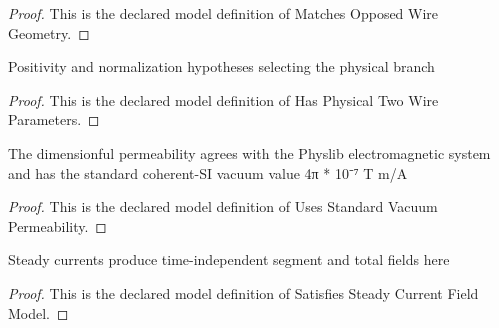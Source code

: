 \begin{proof}
  This is the declared model definition of Matches Opposed Wire Geometry.
\end{proof}
\begin{definition}
  \label{def:physics:phyx-mini-0960:phyxminiproblems-problemphyxmini0960-hasphysicaltwowireparameters}
  Positivity and normalization hypotheses selecting the physical branch
\end{definition}
\begin{proof}
  This is the declared model definition of Has Physical Two Wire Parameters.
\end{proof}
\begin{definition}
  \label{def:physics:phyx-mini-0960:phyxminiproblems-problemphyxmini0960-usesstandardvacuumpermeability}
  The dimensionful permeability agrees with the Physlib electromagnetic system and has the standard coherent-SI vacuum value 4π * 10⁻⁷ T m/A
\end{definition}
\begin{proof}
  This is the declared model definition of Uses Standard Vacuum Permeability.
\end{proof}
\begin{definition}
  \label{def:physics:phyx-mini-0960:phyxminiproblems-problemphyxmini0960-satisfiessteadycurrentfieldmodel}
  Steady currents produce time-independent segment and total fields here
\end{definition}
\begin{proof}
  This is the declared model definition of Satisfies Steady Current Field Model.
\end{proof}
